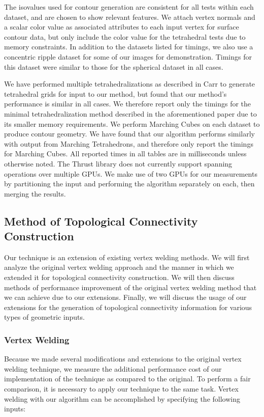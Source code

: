 \documentclass[10pt,journal,cspaper,compsoc]{IEEEtran}
\begin{document}
The isovalues used for contour generation are consistent for all tests within each dataset, and are chosen to show relevant features. We attach vertex normals and a scalar color value as associated attributes to each input vertex for surface contour data, but only include the color value for the tetrahedral tests due to memory constraints. In addition to the datasets listed for timings, we also use a concentric ripple dataset for some of our images for demonstration. Timings for this dataset were similar to those for the spherical dataset in all cases.

We have performed multiple tetrahedralizations as described in Carr \cite{Carr2006} to generate tetrahedral grids for input to our method, but found that our method's performance is similar in all cases. We therefore report only the timings for the minimal tetrahedralization method described in the aforementioned paper due to its smaller memory requirements. We perform Marching Cubes on each dataset to produce contour geometry. We have found that our algorithm performs similarly with output from Marching Tetrahedrons, and therefore only report the timings for Marching Cubes. All reported times in all tables are in milliseconds unless otherwise noted.  The Thrust library does not currently support spanning operations over multiple GPUs. We make use of two GPUs for our measurements by partitioning the input and performing the algorithm separately on each, then merging the results.


\subsection{Method of Topological Connectivity Construction}
Our technique is an extension of existing vertex welding methods. We will first analyze the original vertex welding approach and the manner in which we extended it for topological connectivity construction. We will then discuss methods of performance improvement of the original vertex welding method that we can achieve due to our extensions. Finally, we will discuss the usage of our extensions for the generation of topological connectivity information for various types of geometric inputs.

\subsubsection{Vertex Welding}

Because we made several modifications and extensions to the original vertex welding technique, we measure the additional performance
cost of our implementation of the technique as compared to the original. To perform a fair comparison, it is necessary to apply our technique to the same task. Vertex welding with
our  algorithm can be accomplished by specifying the following inputs:
\end{document}
